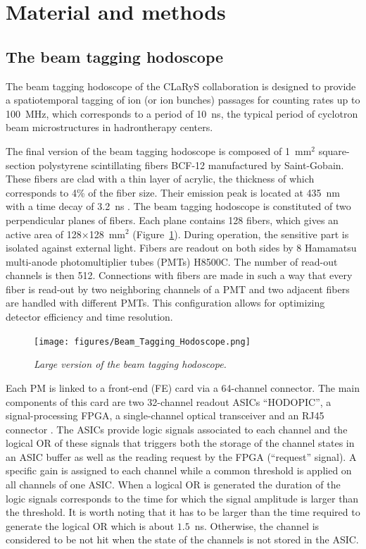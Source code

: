 \documentclass[a4paper,11pt]{article}
\begin{document}
\section{Material and methods}
\subsection{The beam tagging hodoscope}
\label{sec:hodo}

The beam tagging hodoscope of the CLaRyS collaboration is designed to provide a spatiotemporal tagging of ion (or ion bunches) passages for counting rates up to 100~MHz, which corresponds to a period of 10~ns, the typical period of cyclotron beam microstructures in hadrontherapy centers. 

The final version of the beam tagging hodoscope is composed  of 1~mm$^{2}$ square-section polystyrene scintillating fibers BCF-12 manufactured by Saint-Gobain. These fibers are clad with a thin layer of acrylic, the thickness of which corresponds to 4\% of the fiber size. Their emission peak is located at 435~nm with a time decay of 3.2~ns \cite{SaintGobain2017}.
The beam tagging hodoscope is constituted of two perpendicular planes of fibers. Each plane contains 128 fibers, which gives an active area of 128$\times$128~mm$^{2}$ (Figure~\ref{fig:hodoscope}). During operation, the sensitive part is isolated against external light. Fibers are readout on both sides by 8 Hamamatsu multi-anode photomultiplier tubes (PMTs) H8500C. The number of read-out channels is then 512. Connections with fibers are made in such a way that every fiber is read-out by two neighboring channels of a PMT and two adjacent fibers are handled with different PMTs. This configuration allows for optimizing detector efficiency and time resolution. 

\begin{figure}[htb]
\centering
\texttt{[image: figures/Beam\_Tagging\_Hodoscope.png]}
\caption{\small{\textit{Large version of the beam tagging hodoscope.}}}
\label{fig:hodoscope}
\end{figure}

Each PM is linked to a front-end (FE) card via a 64-channel connector. The main components of this card are two 32-channel readout ASICs \enquote{HODOPIC}, a signal-processing FPGA, a single-channel optical transceiver and an RJ45 connector \cite{Chen2019}. The ASICs provide logic signals associated to each channel and the logical OR of these signals that triggers both the storage of the channel states in an ASIC buffer as well as the reading request by the FPGA (\enquote{request} signal). A specific gain is assigned to each channel while a common threshold is applied on all channels of one ASIC. When a logical OR is generated the duration of the logic signals corresponds to the time for which the signal amplitude is larger than the threshold. It is worth noting that it has to be larger than the time required to generate the logical OR which is about $1.5$~ns. Otherwise, the channel is considered to be not hit when the state of the channels is not stored in the ASIC.
\end{document}
